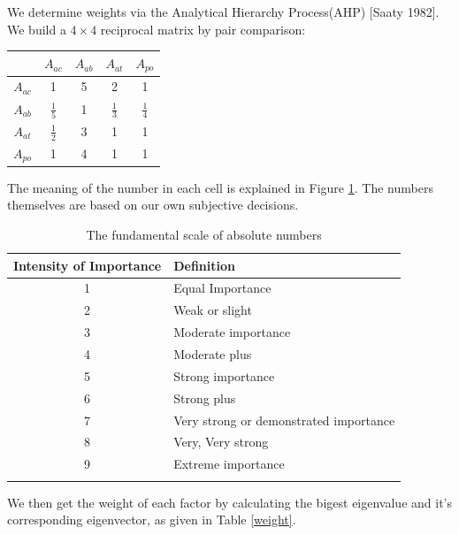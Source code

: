 \documentclass[12pt,a4paper,titlepage]{article}
\begin{document}
We determine weights via the Analytical Hierarchy Process(AHP) [Saaty
1982]. We build a $4 \times 4$ reciprocal matrix by pair comparison:
\begin{center}
\begin{tabular}{|c|c|c|c|c|}
\hline
       &$A_{ac}$      &$A_{ab}$  &$A_{at}$    &$A_{po}$  \\ \hline
 $A_{ac}$ & 1           & 5 & 2            &1            \\ \hline
 $A_{ab}$ &$\frac{1}{5}$ & 1 &$\frac{1}{3}$ & $\frac{1}{4}$\\ \hline
 $A_{at}$ &$\frac{1}{2}$ & 3 & 1            &1            \\ \hline
 $A_{po}$ &1            & 4 & 1            &1            \\ \hline
\end{tabular}
\end{center}

The meaning of the number in each cell is explained in Figure
\ref{important}. The numbers themselves are based on our own
subjective decisions.

\begin{table}[htb]
  \centering
  \begin{tabular}{cl}
    \toprule{}
    Intensity of Importance&Definition \\ \midrule{}
    1                      &Equal Importance \\
    2                      &Weak or slight \\
    3                      &Moderate importance \\
    4                      &Moderate plus \\
    5                      &Strong importance \\
    6                      &Strong plus \\
    7                      &Very strong or demonstrated importance \\
    8                      &Very, Very strong \\
    9                      &Extreme importance \\ \bottomrule{}
  \end{tabular}
  \caption{The fundamental scale of absolute numbers}\label{important}
\end{table}

We then get the weight of each factor by calculating the bigest
eigenvalue and it's corresponding eigenvector, as given in Table \ref{weight}.
\end{document}
